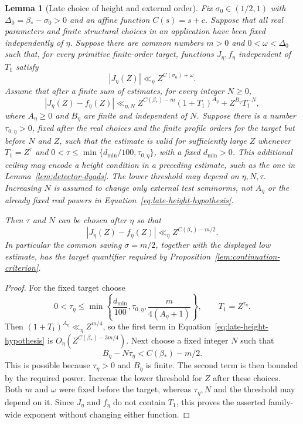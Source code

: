 \documentclass[11pt,a4paper]{article}
\numberwithin{equation}{section}
\numberwithin{figure}{section}
\newtheorem{lemma}[theorem]{Lemma}
\theoremstyle{definition}
\theoremstyle{remark}
\begin{document}
\begin{lemma}[Late choice of height and external order]
\label{lem:late-height-closure}
Fix $\sigma_0\in(1/2,1)$ with $\Delta_0=\beta_*-\sigma_0>0$ and an
affine function $C(s)=s+c$.  Suppose that all real parameters and finite
structural choices in an application have been fixed independently of
$\eta$.  Suppose there are common numbers $m>0$ and
$0<\omega<\Delta_0$ such that, for every primitive finite-order target,
functions $J_\eta,f_\eta$ independent of $T_1$ satisfy
\[
 |J_\eta(Z)|\ll_\eta Z^{C(\sigma_0)+\omega}.
\]
Assume that after a finite sum of estimates, for every integer $N\ge0$,
\begin{equation}
 |J_\eta(Z)-f_\eta(Z)|
 \ll_{\eta,N} Z^{C(\beta_*)-m}(1+T_1)^{A_\eta}
       +Z^{B_\eta}T_1^{-N},
 \label{eq:late-height-hypothesis}
\end{equation}
where $A_\eta\ge0$ and $B_\eta$ are finite and independent of $N$.
Suppose there is a number $\tau_{0,\eta}>0$, fixed after the real choices
and the finite profile orders for the target but before $N$ and $Z$, such
that the estimate is valid for sufficiently large $Z$ whenever
$T_1=Z^\tau$ and
$0<\tau\le\min\{d_{\min}/100,\tau_{0,\eta}\}$, with a fixed
$d_{\min}>0$.
This additional ceiling may encode a height condition in a preceding
estimate, such as the one in Lemma~\ref{lem:detector-dyads}.
The lower threshold may depend on $\eta,N,\tau$.  Increasing $N$ is assumed
to change only external test seminorms, not $A_\eta$ or the already fixed
real powers in Equation~\eqref{eq:late-height-hypothesis}.

Then $\tau$ and $N$ can be chosen after $\eta$ so that
\[
 |J_\eta(Z)-f_\eta(Z)|\ll_\eta Z^{C(\beta_*)-m/2}.
\]
In particular the common saving $\sigma=m/2$, together with the displayed
low estimate, has the target quantifier required by
Proposition~\ref{lem:continuation-criterion}.
\end{lemma}

\begin{proof}
For the fixed target choose
\[
0<\tau_\eta\le
 \min\left\{\frac{d_{\min}}{100},\tau_{0,\eta},
                 \frac{m}{4(A_\eta+1)}\right\},
 \qquad T_1=Z^{\tau_\eta}.
\]
Then $(1+T_1)^{A_\eta}\ll_\eta Z^{m/4}$, so the first term in
Equation~\eqref{eq:late-height-hypothesis} is
$O_\eta(Z^{C(\beta_*)-3m/4})$.  Next choose a fixed integer $N$ such that
\[
 B_\eta-N\tau_\eta<C(\beta_*)-m/2.
\]
This is possible because $\tau_\eta>0$ and $B_\eta$ is finite.  The second
term is then bounded by the required power.  Increase the lower threshold
for $Z$ after these choices.  Both $m$ and $\omega$ were fixed before the
target, whereas $\tau_\eta,N$ and the threshold may depend on it.  Since
$J_\eta$ and $f_\eta$ do not contain $T_1$, this proves the asserted
family-wide exponent without changing either function.
\end{proof}
\end{document}
